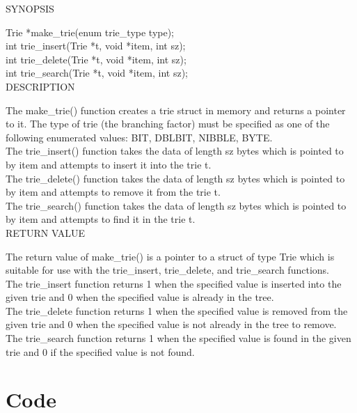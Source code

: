 \documentclass{llncs}
\begin{document}
\noindent SYNOPSIS

Trie *make\_trie(enum trie\_type type);\\
\indent int trie\_insert(Trie *t, void *item, int sz);\\
\indent int trie\_delete(Trie *t, void *item, int sz);\\
\indent int trie\_search(Trie *t, void *item, int sz);\\

\noindent DESCRIPTION

\noindent The make\_trie() function creates a trie struct in memory and returns a pointer to it. The type of trie (the branching factor) must be specified as one of the following enumerated values: BIT, DBLBIT, NIBBLE, BYTE.\\
The trie\_insert() function takes the data of length sz bytes which is pointed to by item and attempts to insert it into the trie t.\\
The trie\_delete() function takes the data of length sz bytes which is pointed to by item and attempts to remove it from the trie t.\\
The trie\_search() function takes the data of length sz bytes which is pointed to by item and attempts to find it in the trie t.\\

\noindent RETURN VALUE

\noindent The return value of make\_trie() is a pointer to a struct of type Trie which is suitable for use with the trie\_insert, trie\_delete, and trie\_search functions.\\
The trie\_insert function returns 1 when the specified value is inserted into the given trie and 0 when the specified value is already in the tree.\\
The trie\_delete function returns 1 when the specified value is removed from the given trie and 0 when the specified value is not already in the tree to remove.\\
The trie\_search function returns 1 when the specified value is found in the given trie and 0 if the specified value is not found.\\

\newpage
\section{Code}

\newpage

\end{document}

